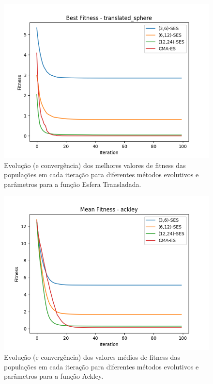 \documentclass[conference]{IEEEtran}
\begin{document}
\begin{figure}[htbp]
\centering
\centerline{\includegraphics[scale=0.5]{imagens/translated_sphere/best_fitness.png}}
\caption{Evolução (e convergência) dos melhores valores de fitness das populações em cada iteração para diferentes métodos evolutivos e parâmetros para a função Esfera Transladada.}
\label{translated_sphere/best_fitness}
\end{figure}

\begin{figure}[htbp]
\centering
\centerline{\includegraphics[scale=0.5]{imagens/ackley/mean_fitness.png}}
\caption{Evolução (e convergência) dos valores médios de fitness das populações em cada iteração para diferentes métodos evolutivos e parâmetros para a função Ackley.}
\label{ackley/mean_fitness}
\end{figure}
\end{document}
